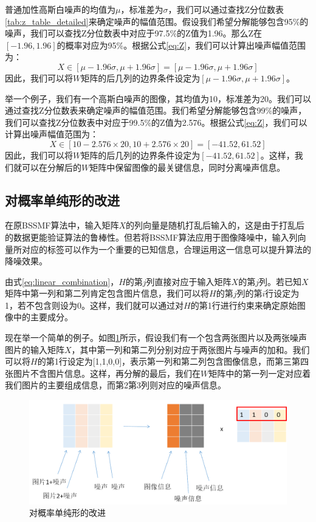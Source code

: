 \documentclass[12pt]{article}
\begin{document}
普通加性高斯白噪声的均值为$\mu$，标准差为$\sigma$，我们可以通过查找Z分位数表\ref{tab:z_table_detailed}来确定噪声的幅值范围。假设我们希望分解能够包含95\%的噪声，我们可以查找Z分位数表中对应于97.5\%的Z值为1.96。那么Z在$[-1.96,1.96]$的概率对应为95\%。根据公式\ref{eq:Z}，我们可以计算出噪声幅值范围为：
\begin{equation*}
    X \in [\mu - 1.96\sigma, \mu + 1.96\sigma] = [\mu -1.96\sigma,\mu + 1.96\sigma]
\end{equation*}
因此，我们可以将$W$矩阵的后几列的边界条件设定为$[\mu -1.96\sigma,\mu + 1.96\sigma]$。

举一个例子，我们有一个高斯白噪声的图像，其均值为10，标准差为20。我们可以通过查找Z分位数表来确定噪声的幅值范围。我们希望分解能够包含99\%的噪声，我们可以查找Z分位数表中对应于99.5\%的Z值为2.576。根据公式\ref{eq:Z}，我们可以计算出噪声幅值范围为：
\begin{equation*}
    X \in [10 - 2.576 \times 20, 10 + 2.576 \times 20] = [-41.52, 61.52]
\end{equation*}
因此，我们可以将$W$矩阵的后几列的边界条件设定为$[-41.52, 61.52]$。这样，我们就可以在分解后的$W$矩阵中保留图像的最关键信息，同时分离噪声信息。

\subsection{对概率单纯形的改进}
在原BSSMF算法中，输入矩阵$X$的列向量是随机打乱后输入的，这是由于打乱后的数据更能验证算法的鲁棒性。但若将BSSMF算法应用于图像降噪中，输入列向量所对应的标签可以作为一个重要的已知信息，合理运用这一信息可以提升算法的降噪效果。

由式\ref{eq:linear_combination}，$H$的第$j$列直接对应于输入矩阵$X$的第$j$列。若已知$X$矩阵中第一列和第二列肯定包含图片信息，我们可以将$H$的第$j$列的第$i$行设定为1，若不包含则设为0。这样，我们就可以通过对$H$的第1行进行约束来确定原始图像中的主要成分。

现在举一个简单的例子。如图\ref{fig:improve_simplex}所示，假设我们有一个包含两张图片以及两张噪声图片的输入矩阵$X$，其中第一列和第二列分别对应于两张图片与噪声的加和。我们可以将$H$的第1行设定为[1,1,0,0]，表示第一列和第二列包含图像信息，而第三第四张图片不含图片信息。这样，再分解的最后，我们在$W$矩阵中的第一列一定对应着我们图片的主要组成信息，而第2第3列则对应的噪声信息。

\begin{figure}[htbp]
    \centering
    \includegraphics[width=\textwidth]{images/add_Simplex.png}
    \caption{对概率单纯形的改进}
    \label{fig:improve_simplex}
\end{figure}
\end{document}
